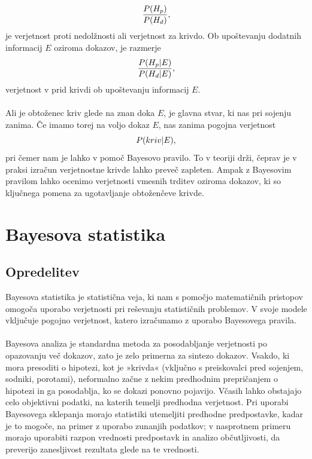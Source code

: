 \documentclass[12pt,a4paper]{amsart}
\theoremstyle{definition} %
\theoremstyle{plain} %
\begin{document}
\begin{equation}
   \frac{P(H_p)}{P(H_d)}, \vspace{2mm}
\end{equation}
je verjetnost proti nedolžnosti ali verjetnost za krivdo. Ob upoštevanju dodatnih informacij $E$ oziroma dokazov, je razmerje
\begin{equation}
   \frac{P(H_p \lvert E)}{P(H_d \lvert E)} \vspace{2mm},
\end{equation}
verjetnost v prid krivdi ob upoštevanju informacij $E$.\\\\
Ali je obtoženec kriv glede na znan doka $E$, je glavna stvar, ki nas pri sojenju zanima. Če imamo torej na voljo dokaz $E$, nas zanima pogojna 
verjetnost
\[
    P(kriv \lvert E), \vspace{2mm}
\]
pri čemer nam je lahko v pomoč Bayesovo pravilo. To v teoriji drži, čeprav je v praksi izračun verjetnostne krivde lahko preveč zapleten. Ampak 
z Bayesovim pravilom lahko ocenimo verjetnosti vmesnih trditev oziroma dokazov, ki so ključnega pomena za ugotavljanje obtoženčeve krivde.

\section{Bayesova statistika}

\subsection{Opredelitev}
Bayesova statistika je statistična veja, ki nam s pomočjo matematičnih pristopov omogoča uporabo verjetnosti pri reševanju statističnih
problemov. V svoje modele vključuje pogojno verjetnost, katero izračunamo z uporabo Bayesovega pravila.\\\\
Bayesova analiza je standardna metoda za posodabljanje verjetnosti po opazovanju več dokazov, zato je zelo primerna za sintezo dokazov.
Vsakdo, ki mora presoditi o hipotezi, kot je »krivda« (vključno s preiskovalci pred sojenjem, sodniki, porotami), neformalno začne z nekim
predhodnim prepričanjem o hipotezi in ga posodablja, ko se dokazi ponovno pojavijo. Včasih lahko obstajajo celo objektivni podatki, na katerih temelji
predhodna verjetnost. Pri uporabi Bayesovega sklepanja morajo statistiki utemeljiti predhodne predpostavke, kadar je to mogoče, na primer z
uporabo zunanjih podatkov; v nasprotnem primeru morajo uporabiti razpon vrednosti predpostavk in analizo občutljivosti, da preverijo zanesljivost rezultata
glede na te vrednosti.
\end{document}
